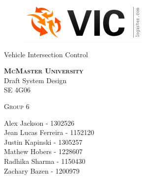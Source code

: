 \documentclass [10pt]{article}
\begin{document}
\begin {center} 

\thispagestyle{empty}
\vspace*{5cm}

\begin {figure}[h!]
\centering
\hspace{-10mm}\includegraphics [scale = .5, trim={.4cm 0 .8cm 0},clip] {figures/vic_logo.png}
\end {figure}

{\fontfamily{\cabinfamily}\selectfont
\Huge{Vehicle Intersection Control} }

\vspace{1 cm}
{\Large\textbf{\textsc{McMaster University}}\\}  \vspace {1cm}
{\large Draft System Design\\ \vspace {0.4 cm} SE 4G06}  \vspace {1cm}

{\large \textsc{Group 6} \\} \vspace{1cm}

{
Alex Jackson - 1302526\\
Jean Lucas Ferreira - 1152120 \\
Justin Kapinski - 1305257\\
Mathew Hobers - 1228607\\
Radhika Sharma - 1150430\\
Zachary Bazen - 1200979}




\end{center}


\pagebreak


\tableofcontents
\listoftables
\listoffigures



\pagebreak


\thispagestyle{empty}
\end{document}

